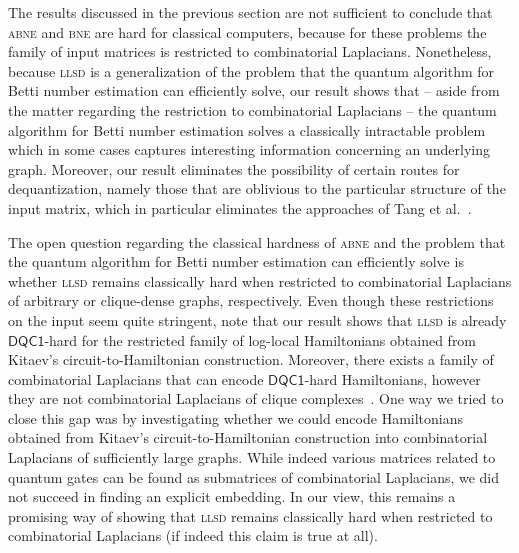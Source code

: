 \documentclass[a4paper, onecolumn, accepted=2022-08-28]{quantumarticle}
\begin{document}
The results discussed in the previous section are not sufficient to conclude that \textsc{abne} and \textsc{bne} are hard for classical computers, because for these problems the family of input matrices is restricted to combinatorial Laplacians.
Nonetheless, because \textsc{llsd} is a generalization of the problem that the quantum algorithm for Betti number estimation can efficiently solve, our result shows that -- aside from the matter regarding the restriction to combinatorial Laplacians -- the quantum algorithm for Betti number estimation solves a classically intractable problem which in some cases captures interesting information concerning an underlying graph.
Moreover, our result eliminates the possibility of certain routes for dequantization, namely those that are oblivious to the particular structure of the input matrix, which in particular eliminates the approaches of Tang et al.~\cite{chia:dequantizations}.

The open question regarding the classical hardness of \textsc{abne} and the problem that the quantum algorithm for Betti number estimation can efficiently solve is whether \textsc{llsd} remains classically hard when restricted to combinatorial Laplacians of arbitrary or clique-dense graphs, respectively.
Even though these restrictions on the input seem quite stringent, note that our result shows that \textsc{llsd} is already $\mathsf{DQC1}$-hard for the restricted family of log-local Hamiltonians obtained from Kitaev's circuit-to-Hamiltonian construction\footnotemark[1].
Moreover, there exists a family of combinatorial Laplacians that can encode $\mathsf{DQC1}$-hard Hamiltonians, however they are not combinatorial Laplacians of clique complexes~\cite{cade:complexity}.
One way we tried to close this gap  was by investigating whether we could encode Hamiltonians obtained from Kitaev's circuit-to-Hamiltonian construction into combinatorial Laplacians of sufficiently large graphs.
While indeed various matrices related to quantum gates can be found as submatrices of combinatorial Laplacians, we did not succeed in finding an explicit embedding.
In our view, this remains a promising way of showing that \textsc{llsd} remains classically hard when restricted to combinatorial Laplacians (if indeed this claim is true at all).
%
\vspace{0pt}
\end{document}
